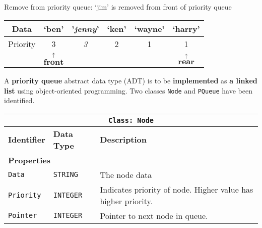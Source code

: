 Remove from priority queue: \textquoteleft jim\textquoteright{} is
removed from front of priority queue 

\begin{tabular}{|c|c|c|c|c|c|}
\hline 
Data & \textquoteleft ben\textquoteright{} & '\emph{jenny}' & \textquoteleft ken\textquoteright{} & \textquoteleft wayne\textquoteright{} & \textquoteleft harry\textquoteright{}\tabularnewline
\hline 
Priority & 3 & \emph{3} & 2 & 1 & 1\tabularnewline
\hline 
\multicolumn{1}{c}{} & \multicolumn{1}{c}{$\overset{\uparrow}{\boldsymbol{\text{front}}}$} & \multicolumn{1}{c}{} & \multicolumn{1}{c}{} & \multicolumn{1}{c}{} & \multicolumn{1}{c}{$\overset{\uparrow}{\boldsymbol{\text{rear}}}$}\tabularnewline
\end{tabular}

A \textbf{priority queue} abstract data type (ADT) is to be \textbf{implemented}
as \textbf{a linked list} using object-oriented programming. Two classes
\texttt{Node} and \texttt{PQueue} have been identified. 
\begin{center}
\begin{tabular}{|l|l|l|}
\hline 
\multicolumn{3}{|c|}{\texttt{Class: Node}}\tabularnewline
\hline 
\texttt{\textbf{\hspace{0.01\columnwidth}}}\textbf{Identifier} & \texttt{\textbf{\hspace{0.01\columnwidth}}}\textbf{Data Type} & \texttt{\textbf{\hspace{0.05\columnwidth}}}\textbf{Description}\tabularnewline
\hline 
\multicolumn{3}{|l|}{\textbf{Properties}}\tabularnewline
\hline 
\texttt{Data} & \texttt{STRING} & The node data\tabularnewline
\hline 
\texttt{Priority} & \texttt{INTEGER} & Indicates priority of node. Higher value has higher priority.\tabularnewline
\hline 
\texttt{Pointer} & \texttt{INTEGER} & Pointer to next node in queue.\tabularnewline
\hline 
\end{tabular}
\par\end{center}

